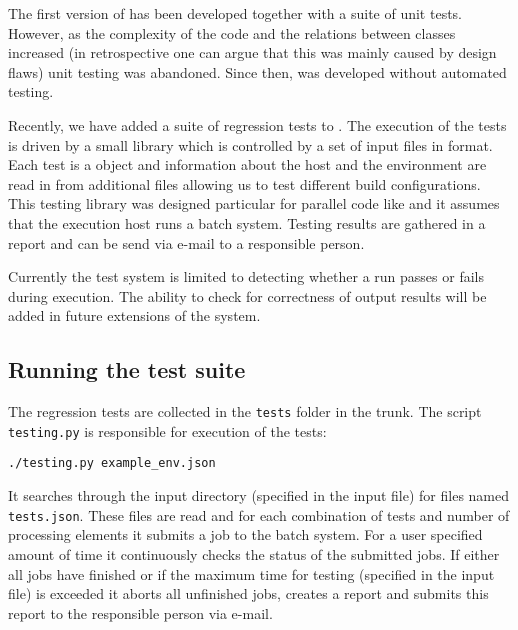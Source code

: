 
The first version of \MACI has been developed together with a suite of unit tests. However, as the complexity of the code and the relations between classes increased (in retrospective one can argue that this was mainly caused by design flaws) unit testing was abandoned. Since then, \MACI was developed without automated testing.\newline

Recently, we have added a suite of regression tests to \MACI. The execution of the tests is driven by a small \PYTHON library which is controlled by a set of input files in \JSON format. Each test is a \JSON object and information about the host and the environment are read in from additional \JSON files allowing us to test different build configurations. This testing library was designed particular for parallel code like \MACI and it assumes that the execution host runs a batch system. Testing results are gathered in a report and can be send via e-mail to a responsible person.\newline

Currently the test system is limited to detecting whether a run passes or fails during execution. The ability to check for correctness of output results will be added in future extensions of the system.\newline

\subsection{Running the test suite}

The regression tests are collected in the \lstinline[style=SHELL]|tests| folder in the \MACI trunk. The script \lstinline[style=SHELL]|testing.py| is responsible for execution of the tests:

\begin{lstlisting}[style=SHELL]
./testing.py example_env.json
\end{lstlisting}


It searches through the input directory (specified in the input file) for files named \lstinline[style=SHELL]|tests.json|. These files are read and for each combination of tests and number of processing elements it submits a job to the batch system. For a user specified amount of time it continuously checks the status of the submitted jobs. If either all jobs have finished or if the maximum time for testing (specified in the input file) is exceeded it aborts all unfinished jobs, creates a report and submits this report to the responsible person via e-mail.


